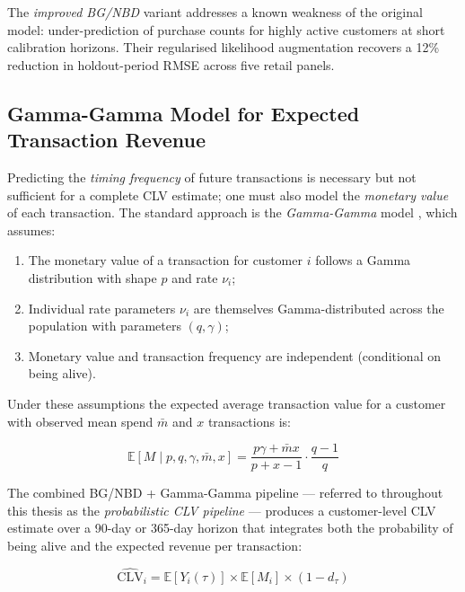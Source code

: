 The \textit{improved BG/NBD} variant \cite{ImprovedBGNBD2022} addresses a known weakness of the original model: under-prediction of purchase counts for highly active customers at short calibration horizons. Their regularised likelihood augmentation recovers a 12\% reduction in holdout-period RMSE across five retail panels.

\subsection{Gamma-Gamma Model for Expected Transaction Revenue}

Predicting the \textit{timing frequency} of future transactions is necessary but not sufficient for a complete CLV estimate; one must also model the \textit{monetary value} of each transaction. The standard approach is the \textit{Gamma-Gamma} model \cite{FaderHardie2013}, which assumes:

\begin{enumerate}[noitemsep]
    \item The monetary value of a transaction for customer $i$ follows a Gamma distribution with shape $p$ and rate $\nu_i$;
    \item Individual rate parameters $\nu_i$ are themselves Gamma-distributed across the population with parameters $(q, \gamma)$;
    \item Monetary value and transaction frequency are independent (conditional on being alive).
\end{enumerate}

Under these assumptions the expected average transaction value for a customer with observed mean spend $\bar{m}$ and $x$ transactions is:

\begin{equation}
    \mathbb{E}[M \mid p, q, \gamma, \bar{m}, x] = \frac{p \gamma + \bar{m} x}{p + x - 1} \cdot \frac{q - 1}{q}
    \label{eq:gamma_gamma}
\end{equation}

The combined BG/NBD + Gamma-Gamma pipeline — referred to throughout this thesis as the \textit{probabilistic CLV pipeline} — produces a customer-level CLV estimate over a 90-day or 365-day horizon that integrates both the probability of being alive and the expected revenue per transaction:

\begin{equation}
    \widehat{\text{CLV}}_i = \mathbb{E}[Y_i(\tau)] \times \mathbb{E}[M_i] \times (1 - d_\tau)
    \label{eq:clv_combined}
\end{equation}

